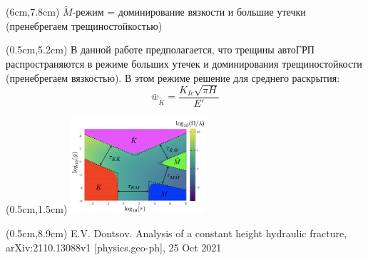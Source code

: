 \documentclass{beamer}
\begin{document}
\begin{frame}
\begin{textblock*}{6cm}(6cm,7.8cm)
\scriptsize
\textcolor{new_green}{
$\tilde{M}$-режим = доминирование вязкости и большие утечки (пренебрегаем трещиностойкостью)
}
\normalsize
\end{textblock*}

\begin{textblock*}{4.5cm}(0.5cm,5.2cm)
\scriptsize
\renewcommand{\baselinestretch}{0.7}
В данной работе предполагается, что трещины автоГРП распространяются в режиме больших утечек и доминирования трещиностойкости (пренебрегаем вязкостью).
В этом режиме решение для среднего раскрытия:
\vspace*{-3mm}
$$
\bar{w}_{\tilde{K}}=\frac{K_{Ic}\sqrt{\pi H}}{E'}
$$
\normalsize
\end{textblock*}



\begin{textblock*}{5cm}(0.5cm,1.5cm)
\includegraphics[width=5cm]{pkn_parametric_space.jpg}
\end{textblock*}

\begin{textblock*}{6cm}(0.5cm,8.9cm)
\tiny
\textcolor{lit_gray}{E.V. Dontsov. Analysis of a constant height hydraulic fracture, arXiv:2110.13088v1 [physics.geo-ph], 25 Oct 2021}
\end{textblock*}

\end{frame}
\end{document}
